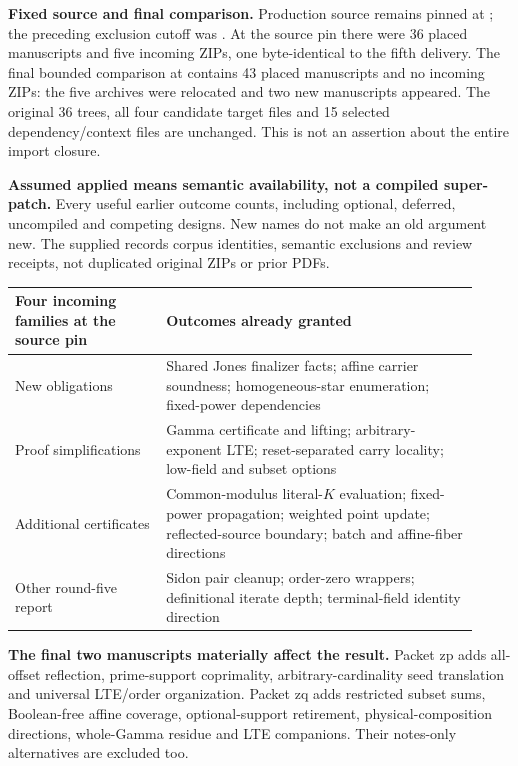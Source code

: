\textbf{Fixed source and final comparison.} Production source remains pinned at
; the preceding exclusion cutoff was
.
At the source pin there were 36 placed manuscripts and five incoming ZIPs, one byte-identical to the fifth delivery. The final bounded comparison at
contains 43 placed manuscripts and no incoming ZIPs: the five archives were relocated and two new manuscripts appeared. The original 36 trees, all four candidate target files and 15 selected dependency/context files are unchanged. This is not an assertion about the entire import closure.

\textbf{Assumed applied means semantic availability, not a compiled super-patch.} Every useful earlier outcome counts, including optional, deferred, uncompiled and competing designs. New names do not make an old argument new. The supplied  records corpus identities, semantic exclusions and review receipts, not duplicated original ZIPs or prior PDFs.

\begin{tabular}{@{}L{0.30\linewidth}L{0.62\linewidth}@{}}\toprule
Four incoming families at the source pin & Outcomes already granted\\\midrule
New obligations & Shared Jones finalizer facts; affine carrier soundness; homogeneous-star enumeration; fixed-power dependencies\\[4pt]
Proof simplifications & Gamma certificate and lifting; arbitrary-exponent LTE; reset-separated carry locality; low-field and subset options\\[4pt]
Additional certificates & Common-modulus literal-$K$ evaluation; fixed-power propagation; weighted point update; reflected-source boundary; batch and affine-fiber directions\\[4pt]
Other round-five report & Sidon pair cleanup; order-zero wrappers; definitional iterate depth; terminal-field identity direction\\\bottomrule
\end{tabular}

\textbf{The final two manuscripts materially affect the result.} Packet zp adds all-offset reflection, prime-support coprimality, arbitrary-cardinality seed translation and universal LTE/order organization. Packet zq adds restricted subset sums, Boolean-free affine coverage, optional-support retirement, physical-composition directions, whole-Gamma residue and LTE companions. Their notes-only alternatives are excluded too.

